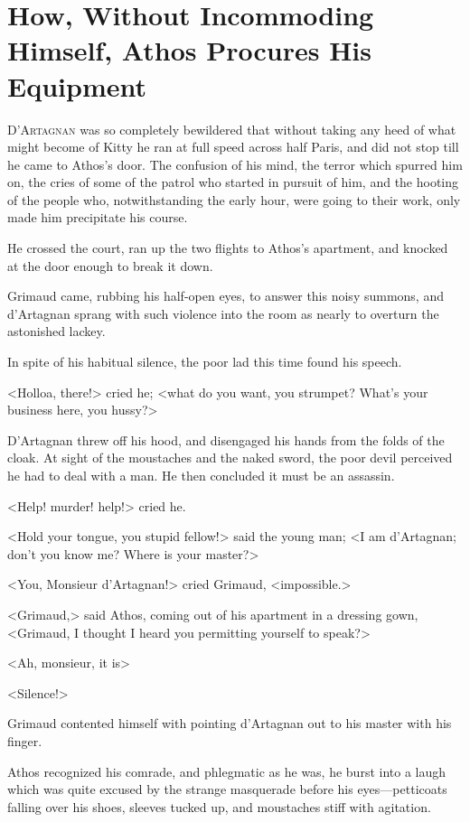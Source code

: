 
\chapter[Athos Procures His Equipment]{How, Without Incommoding Himself, Athos Procures His Equipment} 
	
\lettrine[]{D}{'Artagnan} was so completely bewildered that without taking any heed of what might become of Kitty he ran at full speed across half Paris, and did not stop till he came to Athos's door. The confusion of his mind, the terror which spurred him on, the cries of some of the patrol who started in pursuit of him, and the hooting of the people who, notwithstanding the early hour, were going to their work, only made him precipitate his course. 

He crossed the court, ran up the two flights to Athos's apartment, and knocked at the door enough to break it down. 

Grimaud came, rubbing his half-open eyes, to answer this noisy summons, and d'Artagnan sprang with such violence into the room as nearly to overturn the astonished lackey. 

In spite of his habitual silence, the poor lad this time found his speech. 

<Holloa, there!> cried he; <what do you want, you strumpet? What's your business here, you hussy?> 

D'Artagnan threw off his hood, and disengaged his hands from the folds of the cloak. At sight of the moustaches and the naked sword, the poor devil perceived he had to deal with a man. He then concluded it must be an assassin. 

<Help! murder! help!> cried he. 

<Hold your tongue, you stupid fellow!> said the young man; <I am d'Artagnan; don't you know me? Where is your master?> 

<You, Monsieur d'Artagnan!> cried Grimaud, <impossible.> 

<Grimaud,> said Athos, coming out of his apartment in a dressing gown, <Grimaud, I thought I heard you permitting yourself to speak?> 

<Ah, monsieur, it is\longdash> 

<Silence!> 

Grimaud contented himself with pointing d'Artagnan out to his master with his finger. 

Athos recognized his comrade, and phlegmatic as he was, he burst into a laugh which was quite excused by the strange masquerade before his eyes---petticoats falling over his shoes, sleeves tucked up, and moustaches stiff with agitation. 

